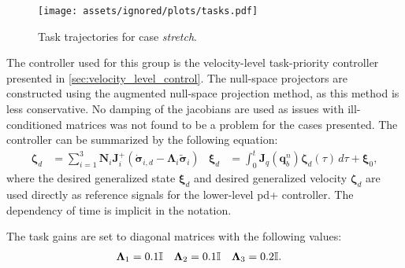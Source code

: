 \begin{figure}[!ht]
    \centering
    \texttt{[image: assets/ignored/plots/tasks.pdf]}
    \caption{Task trajectories for case \textit{stretch}.}
    \label{fig:eelume:tpc:tasks:stretch}
\end{figure}

The controller used for this group is the velocity-level task-priority controller
presented in \autoref{sec:velocity_level_control}.
The null-space projectors are constructed using the augmented null-space projection method,
as this method is less conservative.
No damping of the jacobians
are used as issues with ill-conditioned matrices was not found to be a problem for the cases presented.
The controller can be summarized by the following equation:
\begin{subequations}
\begin{align}
    \bm{\zeta}_d &= \sum_{i=1}^{3} \bm{N}_{i} \bm{J}_i^{+} \left( \dot{\bm{\sigma}}_{i,d} - \bm{\Lambda}_i \tilde{\bm{\sigma}}_i\right)  &
    \bm{\xi}_d &= \int_0^t \bm{J}_q(\bm{q}_b^n)\bm{\zeta}_d(\tau) \, d\tau + \bm{\xi}_0,
\end{align}
\end{subequations}
where the desired generalized state \(\bm{\xi}_d\) and desired generalized velocity \(\bm{\zeta}_d\)
are used directly as reference signals for the lower-level \gls{pd+} controller.
The dependency of time is implicit in the notation.

The task gains are set to diagonal matrices with the following values:
\begin{align}
    \bm{\Lambda}_1 &= 0.1 \mathbb{I} &
    \bm{\Lambda}_2 &= 0.1 \mathbb{I} &
    \bm{\Lambda}_3 &= 0.2 \mathbb{I}.
\end{align}

